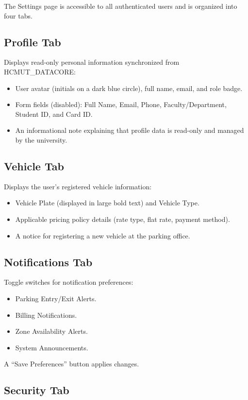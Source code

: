 \documentclass[12pt,a4paper]{article}
\begin{document}
The Settings page is accessible to all authenticated users and is organized into four tabs.

\subsection{Profile Tab}

Displays read-only personal information synchronized from HCMUT\_DATACORE:
\begin{itemize}
    \item User avatar (initials on a dark blue circle), full name, email, and role badge.
    \item Form fields (disabled): Full Name, Email, Phone, Faculty/Department, Student ID, and Card ID.
    \item An informational note explaining that profile data is read-only and managed by the university.
\end{itemize}

\subsection{Vehicle Tab}

Displays the user's registered vehicle information:
\begin{itemize}
    \item Vehicle Plate (displayed in large bold text) and Vehicle Type.
    \item Applicable pricing policy details (rate type, flat rate, payment method).
    \item A notice for registering a new vehicle at the parking office.
\end{itemize}

\subsection{Notifications Tab}

Toggle switches for notification preferences:
\begin{itemize}
    \item Parking Entry/Exit Alerts.
    \item Billing Notifications.
    \item Zone Availability Alerts.
    \item System Announcements.
\end{itemize}

A ``Save Preferences'' button applies changes.

\subsection{Security Tab}
\end{document}
